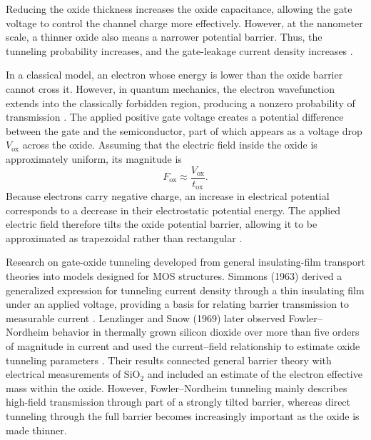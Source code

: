 \documentclass[12pt]{article}
\begin{document}
Reducing the oxide thickness increases the oxide capacitance, allowing the gate voltage to control the channel charge more effectively. However, at the nanometer scale, a thinner oxide also means a narrower potential barrier. Thus, the tunneling probability increases, and the gate-leakage current density increases \cite{green2001review}.

In a classical model, an electron whose energy is lower than the oxide barrier cannot cross it. However, in quantum mechanics, the electron wavefunction extends into the classically forbidden region, producing a nonzero probability of transmission \cite[Sec.~9.2]{griffiths2018}. The applied positive gate voltage creates a potential difference between the gate and the semiconductor, part of which appears as a voltage drop \(V_{\mathrm{ox}}\) across the oxide. Assuming that the electric field inside the oxide is approximately uniform, its magnitude is
\[
F_{\mathrm{ox}}\approx\frac{V_{\mathrm{ox}}}{t_{\mathrm{ox}}}.
\]
Because electrons carry negative charge, an increase in electrical potential corresponds to a decrease in their electrostatic potential energy. The applied electric field therefore tilts the oxide potential barrier, allowing it to be approximated as trapezoidal rather than rectangular \cite{simmons1963}.

Research on gate-oxide tunneling developed from general insulating-film transport theories into models designed for MOS structures. Simmons (1963) derived a generalized expression for tunneling current density through a thin insulating film under an applied voltage, providing a basis for relating barrier transmission to measurable current \cite{simmons1963}. Lenzlinger and Snow (1969) later observed Fowler--Nordheim behavior in thermally grown silicon dioxide over more than five orders of magnitude in current and used the current--field relationship to estimate oxide tunneling parameters \cite{lenzlinger1969}. Their results connected general barrier theory with electrical measurements of SiO$_2$ and included an estimate of the electron effective mass within the oxide. However, Fowler--Nordheim tunneling mainly describes high-field transmission through part of a strongly tilted barrier, whereas direct tunneling through the full barrier becomes increasingly important as the oxide is made thinner.
\end{document}
